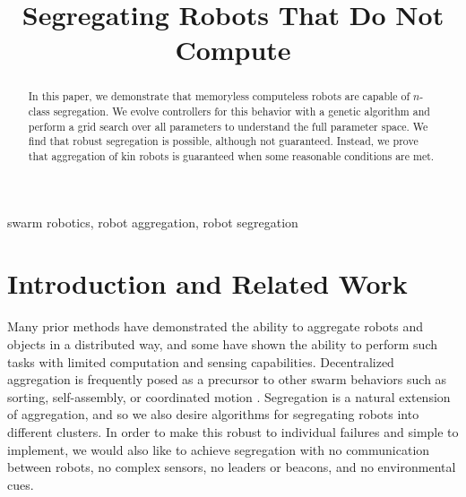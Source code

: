 \documentclass[conference]{IEEEtran}
\begin{document}
\title{Segregating Robots That Do Not Compute}

\author{
\and
{}
\and
{}
}

\maketitle

\begin{abstract}
  In this paper, we demonstrate that memoryless computeless robots are capable of $n$-class segregation. We evolve controllers for this behavior with a genetic algorithm and perform a grid search over all parameters to understand the full parameter space. We find that robust segregation is possible, although not guaranteed. Instead, we prove that aggregation of kin robots is guaranteed when some reasonable conditions are met.
\end{abstract}

\begin{IEEEkeywords}
  swarm robotics, robot aggregation, robot segregation
\end{IEEEkeywords}

\section{Introduction and Related Work}

  Many prior methods have demonstrated the ability to aggregate robots and objects in a distributed way, and some have shown the ability to perform such tasks with limited computation and sensing capabilities. Decentralized aggregation is frequently posed as a precursor to other swarm behaviors such as sorting, self-assembly, or coordinated motion \cite{gauci_evolving_2014} \cite{dorigo_evolving_2004}. Segregation is a natural extension of aggregation, and so we also desire algorithms for segregating robots into different clusters. In order to make this robust to individual failures and simple to implement, we would also like to achieve segregation with no communication between robots, no complex sensors, no leaders or beacons, and no environmental cues.
\end{document}
